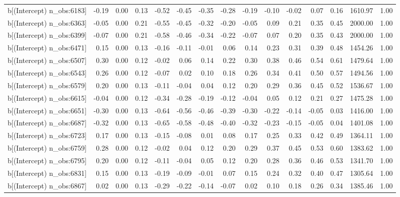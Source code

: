 \begin{table}[ht]
\begin{tabular}{rrrrrrrrrrrrrrr}
  b[(Intercept) n\_obs:6183] & -0.19 & 0.00 & 0.13 & -0.52 & -0.45 & -0.35 & -0.28 & -0.19 & -0.10 & -0.02 & 0.07 & 0.16 & 1610.97 & 1.00 \\ 
  b[(Intercept) n\_obs:6363] & -0.05 & 0.00 & 0.21 & -0.55 & -0.45 & -0.32 & -0.20 & -0.05 & 0.09 & 0.21 & 0.35 & 0.45 & 2000.00 & 1.00 \\ 
  b[(Intercept) n\_obs:6399] & -0.07 & 0.00 & 0.21 & -0.58 & -0.46 & -0.34 & -0.22 & -0.07 & 0.07 & 0.20 & 0.35 & 0.43 & 2000.00 & 1.00 \\ 
  b[(Intercept) n\_obs:6471] & 0.15 & 0.00 & 0.13 & -0.16 & -0.11 & -0.01 & 0.06 & 0.14 & 0.23 & 0.31 & 0.39 & 0.48 & 1454.26 & 1.00 \\ 
  b[(Intercept) n\_obs:6507] & 0.30 & 0.00 & 0.12 & -0.02 & 0.06 & 0.14 & 0.22 & 0.30 & 0.38 & 0.46 & 0.54 & 0.61 & 1479.64 & 1.00 \\ 
  b[(Intercept) n\_obs:6543] & 0.26 & 0.00 & 0.12 & -0.07 & 0.02 & 0.10 & 0.18 & 0.26 & 0.34 & 0.41 & 0.50 & 0.57 & 1494.56 & 1.00 \\ 
  b[(Intercept) n\_obs:6579] & 0.20 & 0.00 & 0.13 & -0.11 & -0.04 & 0.04 & 0.12 & 0.20 & 0.29 & 0.36 & 0.45 & 0.52 & 1536.67 & 1.00 \\ 
  b[(Intercept) n\_obs:6615] & -0.04 & 0.00 & 0.12 & -0.34 & -0.28 & -0.19 & -0.12 & -0.04 & 0.05 & 0.12 & 0.21 & 0.27 & 1475.28 & 1.00 \\ 
  b[(Intercept) n\_obs:6651] & -0.30 & 0.00 & 0.13 & -0.64 & -0.56 & -0.46 & -0.39 & -0.30 & -0.22 & -0.14 & -0.05 & 0.03 & 1416.00 & 1.00 \\ 
  b[(Intercept) n\_obs:6687] & -0.32 & 0.00 & 0.13 & -0.65 & -0.58 & -0.48 & -0.40 & -0.32 & -0.23 & -0.15 & -0.05 & 0.04 & 1401.08 & 1.00 \\ 
  b[(Intercept) n\_obs:6723] & 0.17 & 0.00 & 0.13 & -0.15 & -0.08 & 0.01 & 0.08 & 0.17 & 0.25 & 0.33 & 0.42 & 0.49 & 1364.11 & 1.00 \\ 
  b[(Intercept) n\_obs:6759] & 0.28 & 0.00 & 0.12 & -0.02 & 0.04 & 0.12 & 0.20 & 0.29 & 0.37 & 0.45 & 0.53 & 0.60 & 1383.62 & 1.00 \\ 
  b[(Intercept) n\_obs:6795] & 0.20 & 0.00 & 0.12 & -0.11 & -0.04 & 0.05 & 0.12 & 0.20 & 0.28 & 0.36 & 0.46 & 0.53 & 1341.70 & 1.00 \\ 
  b[(Intercept) n\_obs:6831] & 0.15 & 0.00 & 0.13 & -0.19 & -0.09 & -0.01 & 0.07 & 0.15 & 0.24 & 0.32 & 0.40 & 0.47 & 1305.64 & 1.00 \\ 
  b[(Intercept) n\_obs:6867] & 0.02 & 0.00 & 0.13 & -0.29 & -0.22 & -0.14 & -0.07 & 0.02 & 0.10 & 0.18 & 0.26 & 0.34 & 1385.46 & 1.00 \\ 

\end{tabular}
\end{table}
